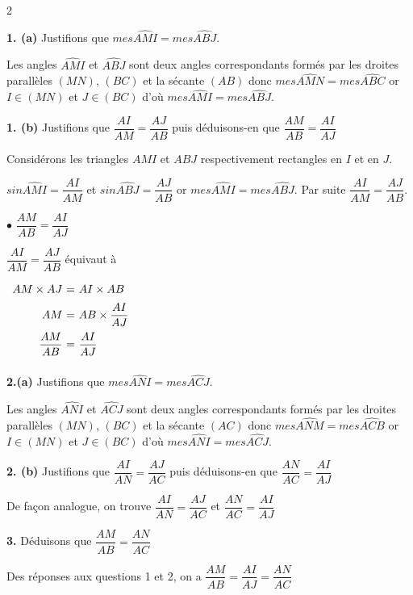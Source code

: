 \begin{multicols*}{2}
\begin{enumerate}
  	\end{enumerate}	
  	\dure
  	\resul
  	\textbf{1. (a)} Justifions que  $mes\widehat{AMI}=mes\widehat{ABJ}$.
  	
  	Les angles  $\widehat{AMI}$ et $\widehat{ABJ}$ sont deux angles correspondants formés par les droites parallèles $(MN)$, $(BC)$ et la sécante $(AB)$ donc $mes\widehat{AMN}=mes\widehat{ABC}$ or $I\in(MN)$ et $J\in(BC)$ d'où $mes\widehat{AMI}=mes\widehat{ABJ}$.
  	
  	\textbf{1. (b)} Justifions que $\dfrac{AI}{AM}=\dfrac{AJ}{AB}$ puis déduisons-en que $\dfrac{AM}{AB}=\dfrac{AI}{AJ}$
  	
  	Considérons les triangles $AMI$ et $ABJ$ respectivement rectangles en $I$ et en $J$. 
  	
  	$sin\widehat{AMI}=\dfrac{AI}{AM}$ et $sin\widehat{ABJ}=\dfrac{AJ}{AB}$  or
  	$mes\widehat{AMI}=mes\widehat{ABJ}$.
  	Par suite $\dfrac{AI}{AM}=\dfrac{AJ}{AB}$.
  	
  	$\bullet$ $\dfrac{AM}{AB}=\dfrac{AI}{AJ}$
  	
  	$\dfrac{AI}{AM}=\dfrac{AJ}{AB}$ équivaut à 
  	
  	$\begin{array}{r@{\ =\ }l} \vspace{0.2cm}
  		AM\times AJ	& AI\times AB\\
  		\vspace{0.2cm}
  		AM	& AB \times \dfrac{AI}{AJ} \\ \vspace{0.2cm}	
  		\dfrac{AM}{AB}	&\dfrac{ AI}{AJ} \\ 
  	\end{array}$  
  	
  	\textbf{2.(a)} Justifions que  $mes\widehat{ANI}=mes\widehat{ACJ}$.
  	
  	Les angles  $\widehat{ANI}$ et $\widehat{ACJ}$ sont deux angles correspondants formés par les droites parallèles $(MN)$, $(BC)$ et la sécante $(AC)$ donc $mes\widehat{ANM}=mes\widehat{ACB}$ or $I\in(MN)$ et $J\in(BC)$ d'où $mes\widehat{ANI}=mes\widehat{ACJ}$.
  	
  	
  	\textbf{2. (b)} Justifions que $\dfrac{AI}{AN}=\dfrac{AJ}{AC}$ puis déduisons-en que $\dfrac{AN}{AC}=\dfrac{AI}{AJ}$ 
  	
  	De façon analogue, on trouve 	$\dfrac{AI}{AN}=\dfrac{AJ}{AC}$ et $\dfrac{AN}{AC}=\dfrac{AI}{AJ}$
  	
  	\textbf{3.}	 Déduisons que $\dfrac{AM}{AB}=\dfrac{AN}{AC}$
  	
  	Des réponses aux questions 1 et 2, on a $ \dfrac{AM}{AB}	=\dfrac{ AI}{AJ}=\dfrac{AN}{AC}$
  	

\end{multicols*}
